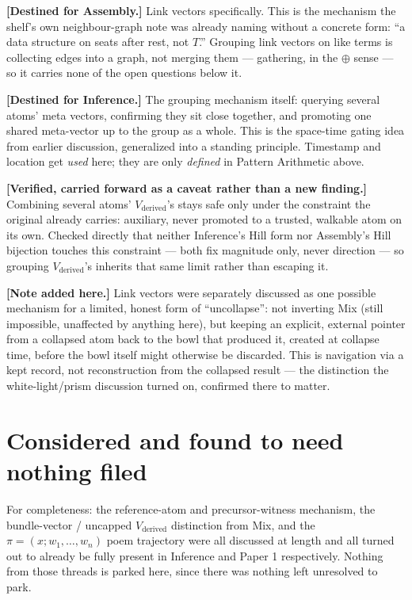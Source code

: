 \documentclass[11pt]{article}
\begin{document}
\textbf{[Destined for Assembly.]} Link vectors specifically. This is
the mechanism the shelf's own neighbour-graph note was already naming
without a concrete form: ``a data structure on seats after rest, not
$T$.'' Grouping link vectors on like terms is collecting edges into a
graph, not merging them --- gathering, in the $\oplus$ sense --- so
it carries none of the open questions below it.

\textbf{[Destined for Inference.]} The grouping mechanism itself:
querying several atoms' meta vectors, confirming they sit close
together, and promoting one shared meta-vector up to the group as a
whole. This is the space-time gating idea from earlier discussion,
generalized into a standing principle. Timestamp and location get
\emph{used} here; they are only \emph{defined} in Pattern Arithmetic
above.

\textbf{[Verified, carried forward as a caveat rather than a new
finding.]} Combining several atoms' $V_{\text{derived}}$'s stays safe
only under the constraint the original already carries: auxiliary,
never promoted to a trusted, walkable atom on its own. Checked
directly that neither Inference's Hill form nor Assembly's Hill
bijection touches this constraint --- both fix magnitude only, never
direction --- so grouping $V_{\text{derived}}$'s inherits that same
limit rather than escaping it.

\textbf{[Note added here.]} Link vectors were separately discussed as
one possible mechanism for a limited, honest form of ``uncollapse'':
not inverting Mix (still impossible, unaffected by anything here),
but keeping an explicit, external pointer from a collapsed atom back
to the bowl that produced it, created at collapse time, before the
bowl itself might otherwise be discarded. This is navigation via a
kept record, not reconstruction from the collapsed result --- the
distinction the white-light/prism discussion turned on, confirmed
there to matter.

\section{Considered and found to need nothing filed}

For completeness: the reference-atom and precursor-witness mechanism,
the bundle-vector / uncapped $V_{\text{derived}}$ distinction from
Mix, and the $\pi=(x;w_1,\ldots,w_n)$ poem trajectory were all
discussed at length and all turned out to already be fully present in
Inference and Paper 1 respectively. Nothing from those threads is
parked here, since there was nothing left unresolved to park.
\end{document}

